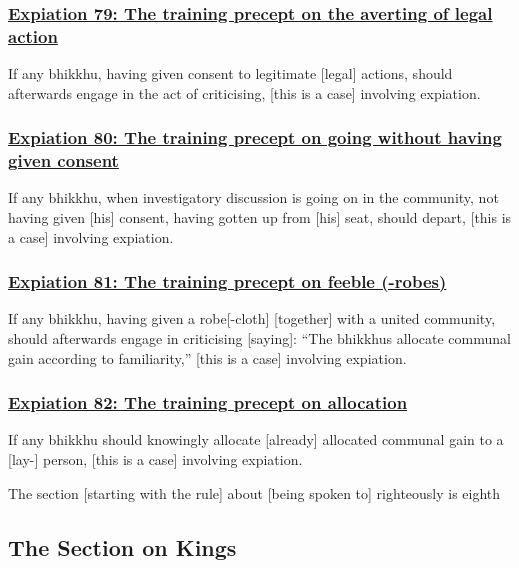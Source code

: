 \subsubsection*{\hyperref[pac79]{Expiation 79: The training precept on the averting of legal action}}
\label{exp79}
If any bhikkhu, having given consent to legitimate [legal] actions, should afterwards engage in the act of criticising, [this is a case] involving expiation.



\subsubsection*{\hyperref[pac80]{Expiation 80: The training precept on going without having given consent}}
\label{exp80}
If any bhikkhu, when investigatory discussion is going on in the community, not having given [his] consent, having gotten up from [his] seat, should depart, [this is a case] involving expiation.



\subsubsection*{\hyperref[pac81]{Expiation 81: The training precept on feeble (-robes)}}
\label{exp81}
If any bhikkhu, having given a robe[-cloth] [together] with a united community, should afterwards engage in criticising [saying]: ``The bhikkhus allocate communal gain according to familiarity,'' [this is a case] involving expiation.



\subsubsection*{\hyperref[pac82]{Expiation 82: The training precept on allocation}}
\label{exp82}
If any bhikkhu should knowingly allocate [already] allocated communal gain to a [lay-] person, [this is a case] involving expiation.

\begin{center}
	The section [starting with the rule] about [being spoken to] righteously is eighth
\end{center}



\setsubsecheadstyle{\subsectionFmt}
\subsection{The Section on Kings}
\label{exp-vagga9}

